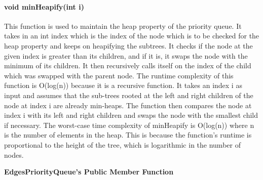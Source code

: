 			\paragraph{{\color{orange}void} {\color{draculapurple}minHeapify}({\color{orange}int} i)}
				This function is used to maintain the heap property of the priority queue. It takes in an {\color{orange}int} index 
				which is the index of the node which is to be checked for the heap property and keeps on heapifying the subtrees. 
				It checks if the node at the given 
				index is greater than its children, and if it is, it swaps the node with the minimum of its children. 
				It then recursively calls itself on the index of the child which was swapped with the parent node.
				The runtime complexity of this function is {\color{lightblue}O(log(n))} because it is a recursive function. 
				It takes an index i as input and assumes that the sub-trees rooted at the left and right children of the node at 
				index {\color{orange}i} are already min-heaps. The function then compares the node at index {\color{orange}i} with its 
				left and right children and swaps the node with the smallest child if necessary. The worst-case time complexity of minHeapify is 
				{\color{lightblue}O(log(n))} where n is the number of elements in the heap. This is because the function's runtime 
				is proportional to the height of the tree, which is logarithmic in the number of nodes.
			
			\begin{center}
				\xdash[6em ]\textbf{EdgesPriorityQueue's Public Member Function} \xdash[6em]
			\end{center}

